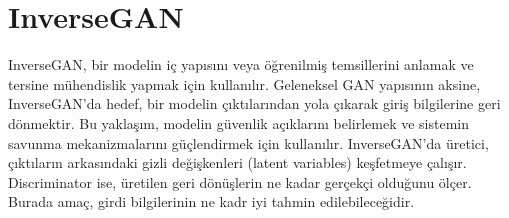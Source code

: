 \section{InverseGAN}

InverseGAN, bir modelin iç yapısını veya öğrenilmiş temsillerini anlamak ve tersine mühendislik yapmak için kullanılır. Geleneksel GAN yapısının aksine, InverseGAN'da hedef, bir modelin çıktılarından yola çıkarak giriş bilgilerine geri dönmektir. Bu yaklaşım, modelin güvenlik açıklarını belirlemek ve sistemin savunma mekanizmalarını güçlendirmek için kullanılır. InverseGAN'da üretici, çıktıların arkasındaki gizli değişkenleri (latent variables) keşfetmeye çalışır. Discriminator ise, üretilen geri dönüşlerin ne kadar gerçekçi olduğunu ölçer. Burada amaç, girdi bilgilerinin ne kadr iyi tahmin edilebileceğidir.

\newpage